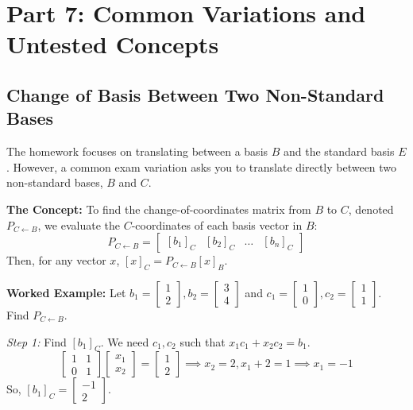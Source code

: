 \documentclass[11pt]{article}
\begin{document}
\newpage
\section{Part 7: Common Variations and Untested Concepts}

\subsection{Change of Basis Between Two Non-Standard Bases}
The homework focuses on translating between a basis $B$ and the standard basis $E$. However, a common exam variation asks you to translate directly between two non-standard bases, $B$ and $C$.

\textbf{The Concept:}
To find the change-of-coordinates matrix from $B$ to $C$, denoted $P_{C \leftarrow B}$, we evaluate the $C$-coordinates of each basis vector in $B$:
\[ P_{C \leftarrow B} = \begin{bmatrix} [b_1]_C & [b_2]_C & \dots & [b_n]_C \end{bmatrix} \]
Then, for any vector $x$, $[x]_C = P_{C \leftarrow B} [x]_B$.

\textbf{Worked Example:}
Let $b_1 = \begin{bmatrix} 1 \\ 2 \end{bmatrix}, b_2 = \begin{bmatrix} 3 \\ 4 \end{bmatrix}$ and $c_1 = \begin{bmatrix} 1 \\ 0 \end{bmatrix}, c_2 = \begin{bmatrix} 1 \\ 1 \end{bmatrix}$. Find $P_{C \leftarrow B}$.

\textit{Step 1:} Find $[b_1]_C$. We need $c_1, c_2$ such that $x_1 c_1 + x_2 c_2 = b_1$.
\[ \begin{bmatrix} 1 & 1 \\ 0 & 1 \end{bmatrix} \begin{bmatrix} x_1 \\ x_2 \end{bmatrix} = \begin{bmatrix} 1 \\ 2 \end{bmatrix} \implies x_2 = 2, x_1 + 2 = 1 \implies x_1 = -1 \]
So, $[b_1]_C = \begin{bmatrix} -1 \\ 2 \end{bmatrix}$.
\end{document}
